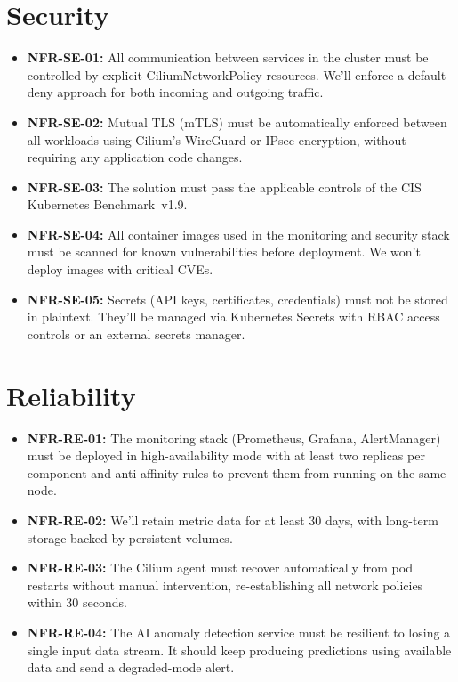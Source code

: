 \section{Security}

\begin{itemize}
    \item \textbf{NFR-SE-01:} All communication between services in the cluster must be controlled by explicit CiliumNetworkPolicy resources. We'll enforce a default-deny approach for both incoming and outgoing traffic.
    \item \textbf{NFR-SE-02:} Mutual TLS (mTLS) must be automatically enforced between all workloads using Cilium's WireGuard or IPsec encryption, without requiring any application code changes.
    \item \textbf{NFR-SE-03:} The solution must pass the applicable controls of the CIS Kubernetes Benchmark~v1.9.
    \item \textbf{NFR-SE-04:} All container images used in the monitoring and security stack must be scanned for known vulnerabilities before deployment. We won't deploy images with critical CVEs.
    \item \textbf{NFR-SE-05:} Secrets (API keys, certificates, credentials) must not be stored in plaintext. They'll be managed via Kubernetes Secrets with RBAC access controls or an external secrets manager.
\end{itemize}

\section{Reliability}

\begin{itemize}
    \item \textbf{NFR-RE-01:} The monitoring stack (Prometheus, Grafana, AlertManager) must be deployed in high-availability mode with at least two replicas per component and anti-affinity rules to prevent them from running on the same node.
    \item \textbf{NFR-RE-02:} We'll retain metric data for at least 30 days, with long-term storage backed by persistent volumes.
    \item \textbf{NFR-RE-03:} The Cilium agent must recover automatically from pod restarts without manual intervention, re-establishing all network policies within 30 seconds.
    \item \textbf{NFR-RE-04:} The AI anomaly detection service must be resilient to losing a single input data stream. It should keep producing predictions using available data and send a degraded-mode alert.
\end{itemize}

